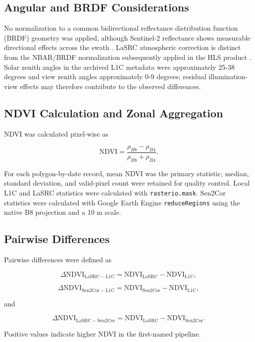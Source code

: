 \documentclass[remotesensing,article,submit,pdftex,oneauthor]{Definitions/mdpi}
\begin{document}
\subsection{Angular and BRDF Considerations}\label{sec-angular}

No normalization to a common bidirectional reflectance distribution
function (BRDF) geometry was applied, although Sentinel-2 reflectance
shows measurable directional effects across the swath \citep{Roy2017}.
LaSRC atmospheric correction is distinct from the NBAR/BRDF
normalization subsequently applied in the HLS product
\citep{Franch2019, Ju2025HLS, USGSHLS2024}. Solar zenith angles in the
archived L1C metadata were approximately 25-38 degrees and view zenith
angles approximately 0-9 degrees; residual illumination-view effects may
therefore contribute to the observed differences.

\subsection{NDVI Calculation and Zonal
Aggregation}\label{sec-aggregation}

NDVI was calculated pixel-wise as

\[
\mathrm{NDVI}=\frac{\rho_{B8}-\rho_{B4}}{\rho_{B8}+\rho_{B4}}.
\]

For each polygon-by-date record, mean NDVI was the primary statistic;
median, standard deviation, and valid-pixel count were retained for
quality control. Local L1C and LaSRC statistics were calculated with
\texttt{rasterio.mask}. Sen2Cor statistics were calculated with Google
Earth Engine \texttt{reduceRegions} using the native B8 projection and a
10 m scale.

\subsection{Pairwise Differences}\label{sec-differences}

Pairwise differences were defined as

\[
\Delta\mathrm{NDVI}_{\mathrm{LaSRC-L1C}}=\mathrm{NDVI}_{\mathrm{LaSRC}}-\mathrm{NDVI}_{\mathrm{L1C}},
\]

\[
\Delta\mathrm{NDVI}_{\mathrm{Sen2Cor-L1C}}=\mathrm{NDVI}_{\mathrm{Sen2Cor}}-\mathrm{NDVI}_{\mathrm{L1C}},
\]

and

\[
\Delta\mathrm{NDVI}_{\mathrm{LaSRC-Sen2Cor}}=\mathrm{NDVI}_{\mathrm{LaSRC}}-\mathrm{NDVI}_{\mathrm{Sen2Cor}}.
\]

Positive values indicate higher NDVI in the first-named pipeline.
\end{document}

